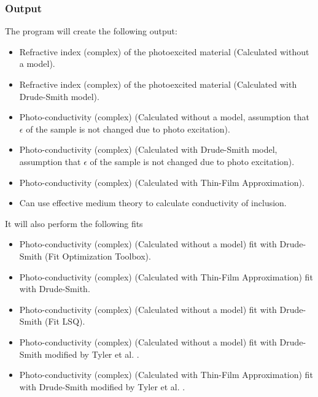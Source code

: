 \documentclass[12pt]{article}
\begin{document}
\subsubsection{Output}
The program will create the following output:
\begin{itemize}
	\item Refractive index (complex) of the photoexcited material (Calculated without a model).
	\item Refractive index (complex) of the photoexcited material (Calculated with Drude-Smith model).
	\item Photo-conductivity (complex) (Calculated without a model, assumption that $\epsilon$ of the sample is not changed due to photo excitation).
	\item Photo-conductivity (complex) (Calculated with Drude-Smith model, assumption that $\epsilon$ of the sample is not changed due to photo excitation).
	\item Photo-conductivity (complex) (Calculated with Thin-Film Approximation).
	\item Can use effective medium theory to calculate conductivity of inclusion.
\end{itemize}
It will also perform the following fits
\begin{itemize}
	\item Photo-conductivity (complex) (Calculated without a model) fit with Drude-Smith (Fit Optimization Toolbox).
	\item Photo-conductivity (complex) (Calculated with Thin-Film Approximation) fit with Drude-Smith.
	\item Photo-conductivity (complex) (Calculated without a model) fit with Drude-Smith  (Fit LSQ).
	\item Photo-conductivity (complex) (Calculated without a model) fit with Drude-Smith modified by Tyler et al. \cite{Cocker2017}.
	\item Photo-conductivity (complex) (Calculated with Thin-Film Approximation) fit with Drude-Smith modified by Tyler et al. \cite{Cocker2017}.
\end{itemize}


\end{document}
